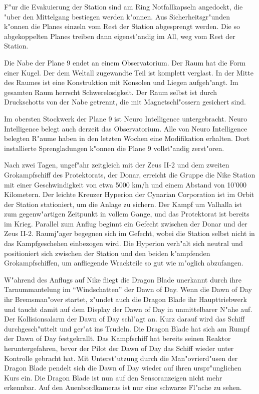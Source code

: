 F"ur die Evakuierung der Station sind am Ring Notfallkapseln angedockt, die "uber den Mittelgang bestiegen werden k"onnen. Aus Sicherheitsgr"unden k"onnen die Planes einzeln vom Rest der Station abgesprengt werden. Die so abgekoppelten Planes treiben dann eigenst"andig im All, weg vom Rest der Station.

Die Nabe der Plane 9 endet an einem Observatorium. Der Raum hat die Form einer Kugel. Der dem Weltall zugewandte Teil ist komplett verglast. In der Mitte des Raumes ist eine Konstruktion mit Konsolen und Liegen aufgeh"angt. Im gesamten Raum herrscht Schwerelosigkeit. Der Raum selbst ist durch Druckschotts von der Nabe getrennt, die mit Magnetschl"ossern gesichert sind.

Im obersten Stockwerk der Plane 9 ist Neuro Intelligence untergebracht. Neuro Intelligence belegt auch derzeit das Observatorium. Alle von Neuro Intelligence belegten R"aume haben in den letzten Wochen eine Modifikation erhalten. Dort installierte Sprengladungen k"onnen die Plane 9 vollst"andig zerst"oren.


Nach zwei Tagen, ungef"ahr zeitgleich mit der Zeus II-2 und dem zweiten Gro\3kampfschiff des Protektorats, der Donar, erreicht die Gruppe die Nike Station mit einer Geschwindigkeit von etwa 5000 km/h und einem Abstand von 10'000 Kilometern. Der leichte Kreuzer Hyperion der Cynarian Corporation ist im Orbit der Station stationiert, um die Anlage zu sichern. Der Kampf um Valhalla ist zum gegenw"artigen Zeitpunkt in vollem Gange, und das Protektorat ist bereits im Krieg. Parallel zum Anflug beginnt ein Gefecht zwischen der Donar und der Zeus II-2. Raumj"ager begegnen sich im Gefecht, wobei die Station selbst nicht in das Kampfgeschehen einbezogen wird. Die Hyperion verh"alt sich neutral und positioniert sich zwischen der Station und den beiden k"ampfenden Gro\3kampfschiffen, um anfliegende Wrackteile so gut wie m"oglich abzufangen.

W"ahrend des Anflugs auf Nike fliegt die Dragon Blade unerkannt durch ihre Tarnummantelung im ``Windschatten'' der Dawn of Day. Wenn die Dawn of Day ihr Bremsman"over startet, z"undet auch die Dragon Blade ihr Haupttriebwerk und taucht damit auf dem Display der Dawn of Day in unmittelbarer N"ahe auf. Der Kollisionsalarm der Dawn of Day schl"agt an. Kurz darauf wird das Schiff durchgesch"uttelt und ger"at ins Trudeln. Die Dragon Blade hat sich am Rumpf der Dawn of Day festgekrallt. Das Kampfschiff hat bereits seinen Reaktor heruntergefahren, bevor der Pilot der Dawn of Day das Schiff wieder unter Kontrolle gebracht hat. Mit Unterst"utzung durch die Man"ovrierd"usen der Dragon Blade pendelt sich die Dawn of Day wieder auf ihren urspr"unglichen Kurs ein. Die Dragon Blade ist nun auf den Sensoranzeigen nicht mehr erkennbar. Auf den Au\3enbordkameras ist nur eine schwarze Fl"ache zu sehen.

